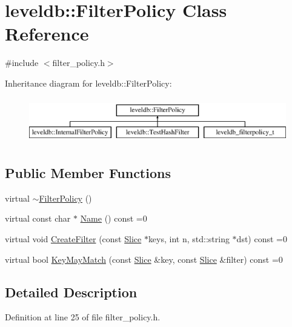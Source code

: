 \hypertarget{classleveldb_1_1_filter_policy}{}\section{leveldb\+:\+:Filter\+Policy Class Reference}
\label{classleveldb_1_1_filter_policy}


{\ttfamily \#include $<$filter\+\_\+policy.\+h$>$}

Inheritance diagram for leveldb\+:\+:Filter\+Policy\+:\begin{figure}[H]
\begin{center}
\leavevmode
\includegraphics[height=2.000000cm]{classleveldb_1_1_filter_policy}
\end{center}
\end{figure}
\subsection*{Public Member Functions}
\begin{DoxyCompactItemize}
\item 
virtual \hyperlink{classleveldb_1_1_filter_policy_a4134b35d7dd640c7c6f182bf7305f158}{$\sim$\+Filter\+Policy} ()
\item 
virtual const char $\ast$ \hyperlink{classleveldb_1_1_filter_policy_afd5e951892a2e740f186c0658913ea1b}{Name} () const =0
\item 
virtual void \hyperlink{classleveldb_1_1_filter_policy_a355e9797e16dd16b93d19056781126b2}{Create\+Filter} (const \hyperlink{classleveldb_1_1_slice}{Slice} $\ast$keys, int n, std\+::string $\ast$dst) const =0
\item 
virtual bool \hyperlink{classleveldb_1_1_filter_policy_a6f8ba10ea25e0b4b8d0a6607c361c718}{Key\+May\+Match} (const \hyperlink{classleveldb_1_1_slice}{Slice} \&key, const \hyperlink{classleveldb_1_1_slice}{Slice} \&filter) const =0
\end{DoxyCompactItemize}


\subsection{Detailed Description}


Definition at line 25 of file filter\+\_\+policy.\+h.



